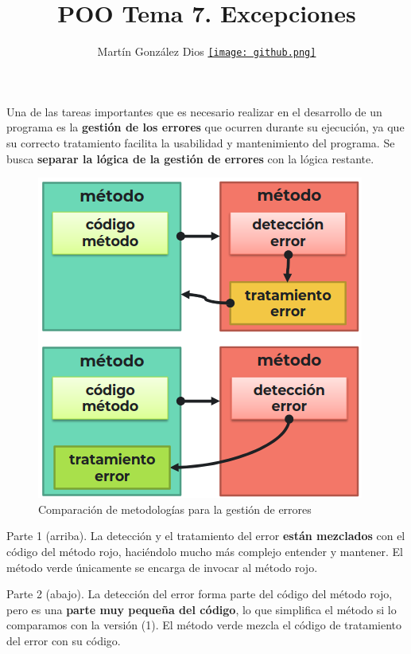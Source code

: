 \documentclass{article}
\title{POO Tema 7. Excepciones}
\author{Martín González Dios 
\href{https://github.com/martindios}{\texttt{[image: github.png]}}}
\begin{document}
\maketitle

Una de las tareas importantes que es necesario realizar en el desarrollo de un programa es la \textbf{gestión de los errores} que ocurren durante su ejecución, ya que su correcto tratamiento facilita la usabilidad y mantenimiento del programa. Se busca \textbf{separar la lógica de la gestión de errores} con la lógica restante. \\

\begin{figure}
    \centering
    \includegraphics[width=\linewidth]{img-t7/img_439_15.png}
    \caption{Comparación de metodologías para la gestión de errores}
\end{figure}

Parte 1 (arriba). La detección y el tratamiento del error \textbf{están mezclados} con el código del método rojo, haciéndolo mucho más complejo entender y mantener. 
El método verde únicamente se encarga de invocar al método rojo.

Parte 2 (abajo). La detección del error forma parte del código del método rojo, pero es
una \textbf{parte muy pequeña del código}, lo que simplifica el método si lo comparamos con la versión (1).
El método verde mezcla el código de tratamiento del error con su código. \\
\end{document}
